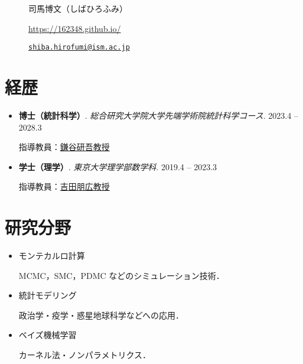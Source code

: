 \documentclass[
  11pt,
]{article}
\date{}
\renewcommand{\labelitemi}{\textcolor{minty}{\faCheckCircle}} %
\begin{document}
\begin{figure}

\begin{minipage}{0.50\linewidth}
\Huge 司馬博文（しばひろふみ）\end{minipage}%
%
\begin{minipage}{0.50\linewidth}

\color{minty}

\hfill {} \url{https://162348.github.io/}

\par

\hfill {}
\href{mailto:shiba.hirofumi@ism.ac.jp}{\nolinkurl{shiba.hirofumi@ism.ac.jp}}

\par

\end{minipage}%

\end{figure}%

\vspace{-1em}

\section{経歴}\label{ux7d4cux6b74}

\renewcommand{\labelitemi}{\textcolor{minty}{\faGraduationCap}}

\begin{itemize}
\item
  \textbf{博士（統計科学）}.
  \emph{総合研究大学院大学先端学術院統計科学コース}. \hfill {2023.4 --
  2028.3}

  指導教員：\href{https://sites.google.com/view/kengokamatani/home}{鎌谷研吾教授}
\item
  \textbf{学士（理学）}. \emph{東京大学理学部数学科}. \hfill {2019.4 --
  2023.3}

  指導教員：\href{https://www.ms.u-tokyo.ac.jp/~nakahiro/hp-naka-e}{吉田朋広教授}
\end{itemize}

\section{研究分野}\label{ux7814ux7a76ux5206ux91ce}

\begin{itemize}
\item
  モンテカルロ計算

  MCMC，SMC，PDMC などのシミュレーション技術．
\item
  統計モデリング

  政治学・疫学・惑星地球科学などへの応用．
\item
  ベイズ機械学習

  カーネル法・ノンパラメトリクス．
\end{itemize}
\end{document}
